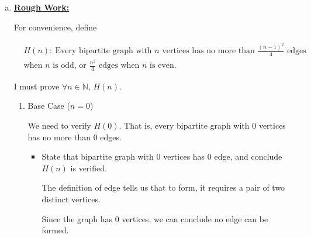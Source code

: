 \documentclass[12pt]{article}
\begin{document}
\begin{enumerate}[a.]




    \item

    \bigskip

    \begin{mdframed}
        \underline{\textbf{Rough Work:}}

        \bigskip

        For convenience, define

        \begin{align*}
        & H(n):\:\text{Every bipartite graph with $n$ vertices has no more than
        $\frac{(n-1)^2}{4}$ edges}\\
        & \text{when $n$ is odd, or $\frac{n^2}{4}$ edges when $n$ is even.}
        \end{align*}

        \bigskip

        I must prove $\forall n \in \mathbb{N}$, $H(n)$.

        \bigskip

        \begin{enumerate}[1.]
            \item Base Case ($n = 0$)

            \bigskip

            We need to verify $H(0)$. That is, every bipartite graph with 0 vertices
            has no more than 0 edges.

            \bigskip

            \begin{itemize}
                \item State that bipartite graph with 0 vertices has 0 edge, and conclude $H(n)$ is verified.

                \begin{mdframed}
                The definition of edge tells us that to form, it requires a pair of two
                distinct vertices.

                \bigskip

                Since the graph has 0 vertices, we can conclude no edge can be
                formed.
                \end{mdframed}
            \end{itemize}


\end{enumerate}
\end{mdframed}
\end{enumerate}
\end{document}
